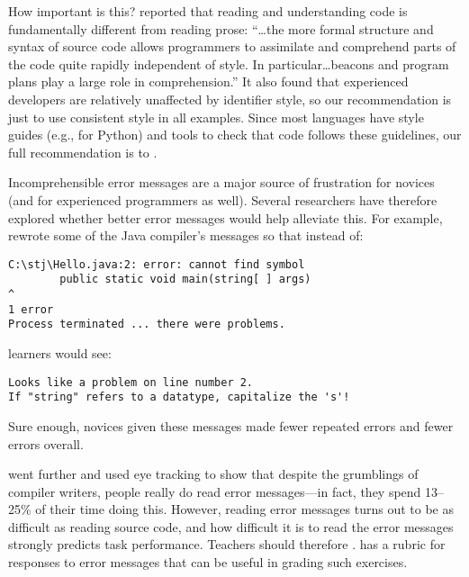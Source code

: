 How important is this?
\cite{Bink2012} reported that reading and understanding code is fundamentally different from reading prose:
``{\ldots}the more formal structure and syntax of source code
allows programmers to assimilate and comprehend parts of the code quite rapidly independent of style.
In particular{\ldots}beacons and program plans play a large role in comprehension.''
It also found that experienced developers are relatively unaffected by identifier style,
so our recommendation is just to use consistent style in all examples.
Since most languages have style guides
(e.g.,  for Python)
and tools to check that code follows these guidelines,
our full recommendation is to
.


Incomprehensible error messages are a major source of frustration for novices
(and for experienced programmers as well).
Several researchers have therefore explored whether better error messages would help alleviate this.
For example,
\cite{Beck2016} rewrote some of the Java compiler's messages so that instead of:

\begin{verbatim}
C:\stj\Hello.java:2: error: cannot find symbol
        public static void main(string[ ] args)
^
1 error
Process terminated ... there were problems.
\end{verbatim}

\noindent
learners would see:

\begin{verbatim}
Looks like a problem on line number 2.
If "string" refers to a datatype, capitalize the 's'!
\end{verbatim}

\noindent
Sure enough,
novices given these messages made fewer repeated errors and fewer errors overall.

\cite{Bari2017} went further and used eye tracking to show that
despite the grumblings of compiler writers,
people really do read error messages---in fact, they spend 13--25\% of their time doing this.
However,
reading error messages turns out to be as difficult as reading source code,
and how difficult it is to read the error messages strongly predicts task performance.
Teachers should therefore
.
\cite{Marc2011} has a rubric for responses to error messages that can be useful in grading such exercises.

